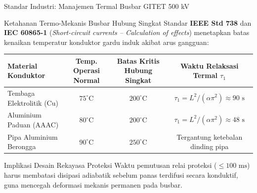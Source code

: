 \documentclass[aspectratio=169,10pt]{beamer}
\begin{document}
\begin{frame}{Standar Industri: Manajemen Termal Busbar GITET 500 kV}
  \begin{block}{Ketahanan Termo-Mekanis Busbar Hubung Singkat}
    Standar \textbf{IEEE Std 738} dan \textbf{IEC 60865-1} (\textit{Short-circuit currents -- Calculation of effects}) menetapkan batas kenaikan temperatur konduktor gardu induk akibat arus gangguan:
  \end{block}
  \vspace{0.1cm}
  \begin{table}[h]
    \centering
    \scriptsize
    \begin{tabular}{lccc}
      \toprule
      \textbf{Material Konduktor} & \textbf{Temp. Operasi Normal} & \textbf{Batas Kritis Hubung Singkat} & \textbf{Waktu Relaksasi Termal $\tau_1$} \\
      \midrule
      Tembaga Elektrolitik (Cu) & $75^\circ\text{C}$ & $200^\circ\text{C}$ & $\tau_1 = L^2 / (\alpha \pi^2) \approx 90\text{ s}$ \\
      Aluminium Paduan (AAAC) & $80^\circ\text{C}$ & $200^\circ\text{C}$ & $\tau_1 = L^2 / (\alpha \pi^2) \approx 48\text{ s}$ \\
      Pipa Aluminium Berongga & $90^\circ\text{C}$ & $250^\circ\text{C}$ & Tergantung ketebalan dinding pipa \\
      \bottomrule
    \end{tabular}
  \end{table}
  \begin{alertblock}{Implikasi Desain Rekayasa Proteksi}
    Waktu pemutusan relai proteksi ($\le 100\text{ ms}$) harus membatasi disipasi adiabatik sebelum panas terdifusi secara konduktif, guna mencegah deformasi mekanis permanen pada busbar.
  \end{alertblock}
\end{frame}
\end{document}
